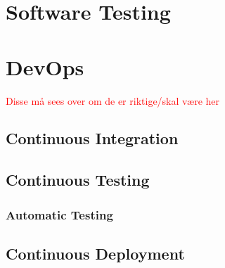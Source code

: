 \section{Software Testing}

\section{DevOps}

\textcolor{red}{Disse må sees over om de er riktige/skal være her}
\subsection{Continuous Integration}

\subsection{Continuous Testing}

\subsubsection{Automatic Testing}


\subsection{Continuous Deployment}